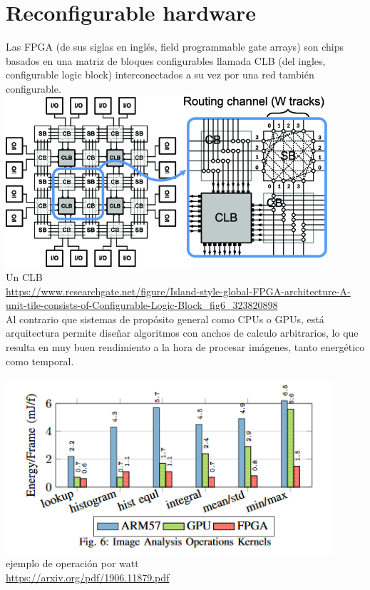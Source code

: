 \section{Reconfigurable hardware}
Las FPGA (de sus siglas en inglés, field programmable gate arrays) son chips basados en una matriz de bloques configurables llamada CLB (del ingles, configurable logic block) interconectados a su vez por una red también configurable.
\\
\includegraphics[height=2.5in]{figures/clb.png}
\\
Un CLB
\\
\url{https://www.researchgate.net/figure/Island-style-global-FPGA-architecture-A-unit-tile-consists-of-Configurable-Logic-Block_fig6_323820898}
\\
Al contrario que sistemas de propósito general como CPUs o GPUs, está arquitectura permite diseñar algoritmos con anchos de calculo arbitrarios, lo que resulta en muy buen rendimiento a la hora de procesar imágenes, tanto energético como temporal.
\\
\\
\includegraphics[height=2.5in]{figures/op_watt.png}
\\
ejemplo de operación por watt
\\
\url{https://arxiv.org/pdf/1906.11879.pdf}
\\
